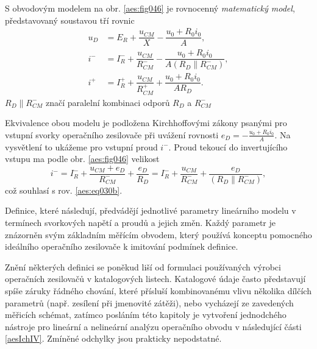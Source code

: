       S obvodovým modelem na obr. \ref{aes:fig046} je rovnocenný \emph{matematický model},
      představovaný soustavou tří rovnic
      \begin{subequations}\label{aes:eq030}
        \begin{align}
          u_D &= E_R   + \dfrac{u_{CM}}{X} - \dfrac{u_0 + R_0i_0}{A},     \label{aes:eq030a}   \\
          i^- &= I_R^- + \dfrac{u_{CM}}{R_{CM}^-}
                       - \dfrac{u_0 + R_0i_0}{A(R_D\parallel R_{CM}^-)},  \label{aes:eq030b}   \\ 
          i^+ &= I_R^+ + \dfrac{u_{CM}}{R_{CM}^+}
                       + \dfrac{u_0 + R_0i_0}{AR_D}.                      \label{aes:eq030c}
        \end{align}
      \end{subequations}
      \(R_D\parallel R_{CM}^-\) značí paralelní kombinaci odporů \(R_D\) a \(R_{CM}^-\)
      
      Ekvivalence obou modelu je podložena Kirchhoffovými zákony psanými pro vstupní svorky
      operačního zesilovače při uvážení rovnosti \(e_D = -\frac{u_0 +R_0i_0}{A}\). Na vysvětlení to
      ukážeme pro vstupní proud \(i^-\). Proud tekoucí do invertujícího vstupu ma podle obr.
      \ref{aes:fig046} velikost
      \begin{equation*}
        i^- = I_R^- + \dfrac{u_{CM} + e_D}{R_{CM}^-} + \dfrac{e_D}{R_D} 
            = I_R^- + \dfrac{u_{CM}}{R_{CM}^-} + \dfrac{e_D}{(R_D\parallel R_{CM}^-)},
      \end{equation*}
      což souhlasí s rov. \ref{aes:eq030b}.

      Definice, které následují, předvádějí jednotlivé parametry lineárního modelu v termínech
      svorkových napětí a proudů a jejich změn. Každý parametr je znázorněn svým základním měřícím
      obvodem, který používá konceptu pomocného ideálního operačního zesilovače k imitování podmínek
      definice.

      Znění některých definici se poněkud liší od formulaci používaných výrobci operačních
      zesilovačů v katalogových listech. Katalogové údaje často představují spíše záruky řádného
      chování, které přísluší kombinovanému vlivu několika dílčích parametrů (např. zesílení při
      jmenovité zátěži), nebo vycházejí ze zavedených měřicích schémat, zatímco posláním této
      kapitoly je vytvoření jednodchého nástroje pro lineární a nelineární analýzu operačního obvodu
      v následující části \ref{aesIchIV}. Zmíněné odchylky jsou prakticky nepodstatné.
    
